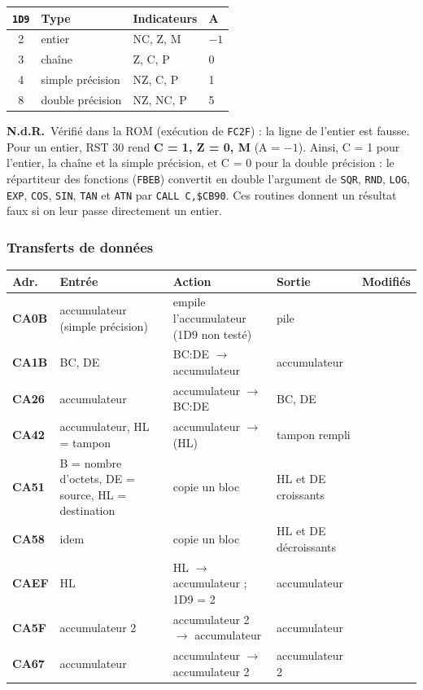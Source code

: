 \documentclass[a4paper,10pt]{article}
\makeatletter
\newcommand{\hex}[1]{\texttt{#1}}
\newcommand{\nota}[1]{\textcolor{red!60!black}{\small\textbf{N.d.R.}~#1}}
\newenvironment{routines}
  {\small\begin{longtable}{@{}>{\ttfamily\bfseries}p{1.1cm}>{\raggedright}p{4.0cm}>{\raggedright}p{5.0cm}>{\raggedright}p{3.1cm}>{\raggedright\arraybackslash}p{2.1cm}@{}}
   \toprule
   \normalfont\bfseries Adr. & \textbf{Entrée} & \textbf{Action} & \textbf{Sortie} & \textbf{Modifiés}\\
   \midrule\endhead
   \bottomrule\endfoot}
  {\end{longtable}}
\makeatother
\begin{document}
\begin{center}\small
\begin{tabular}{@{}clll@{}}
\toprule
\hex{1D9} & Type & Indicateurs & A \\
\midrule
2 & entier & NC, Z, M & $-1$ \\
3 & chaîne & Z, C, P & 0 \\
4 & simple précision & NZ, C, P & 1 \\
8 & double précision & NZ, NC, P & 5 \\
\bottomrule
\end{tabular}
\end{center}
\nota{Vérifié dans la ROM (exécution de \hex{FC2F}) : la ligne de l'entier est
fausse. Pour un entier, RST 30 rend \textbf{C = 1, Z = 0, M} (A = $-1$).
Ainsi, C = 1 pour l'entier, la chaîne et la simple précision, et C = 0 pour la
double précision : le répartiteur des fonctions (\hex{FBEB}) convertit en
double l'argument de \texttt{SQR}, \texttt{RND}, \texttt{LOG}, \texttt{EXP},
\texttt{COS}, \texttt{SIN}, \texttt{TAN} et \texttt{ATN} par
\texttt{CALL C,\$CB90}. Ces routines donnent un résultat faux si on leur passe
directement un entier.}

\subsubsection*{Transferts de données}
\begin{routines}
CA0B & accumulateur (simple précision) & empile l'accumulateur (1D9 non testé) & pile & \\
CA1B & BC, DE & BC\string:DE $\to$ accumulateur & accumulateur & \\
CA26 & accumulateur & accumulateur $\to$ BC\string:DE & BC, DE & \\
CA42 & accumulateur, HL = tampon & accumulateur $\to$ (HL) & tampon rempli & \\
CA51 & B = nombre d'octets, DE = source, HL = destination & copie un bloc & HL et DE croissants & \\
CA58 & idem & copie un bloc & HL et DE décroissants & \\
CAEF & HL & HL $\to$ accumulateur ; 1D9 = 2 & accumulateur & \\
CA5F & accumulateur 2 & accumulateur 2 $\to$ accumulateur & accumulateur & \\
CA67 & accumulateur & accumulateur $\to$ accumulateur 2 & accumulateur 2 & \\
\end{routines}
\end{document}
